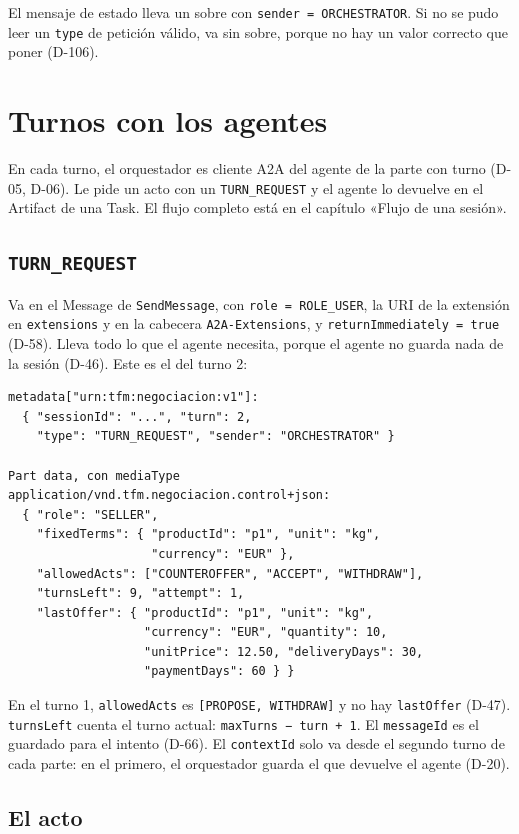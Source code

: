 El mensaje de estado lleva un sobre con \texttt{sender = ORCHESTRATOR}. Si no se pudo leer un \texttt{type} de petición válido, va sin sobre, porque no hay un valor correcto que poner (D-106).

\section{Turnos con los agentes}

En cada turno, el orquestador es cliente A2A del agente de la parte con turno (D-05, D-06). Le pide un acto con un \texttt{TURN\_REQUEST} y el agente lo devuelve en el Artifact de una Task. El flujo completo está en el capítulo «Flujo de una sesión».

\subsection{\texttt{TURN\_REQUEST}}

Va en el Message de \texttt{SendMessage}, con \texttt{role = ROLE\_USER}, la URI de la extensión en \texttt{extensions} y en la cabecera \texttt{A2A-Extensions}, y \texttt{returnImmediately = true} (D-58). Lleva todo lo que el agente necesita, porque el agente no guarda nada de la sesión (D-46). Este es el del turno 2:

\begin{verbatim}
metadata["urn:tfm:negociacion:v1"]:
  { "sessionId": "...", "turn": 2,
    "type": "TURN_REQUEST", "sender": "ORCHESTRATOR" }

Part data, con mediaType
application/vnd.tfm.negociacion.control+json:
  { "role": "SELLER",
    "fixedTerms": { "productId": "p1", "unit": "kg",
                    "currency": "EUR" },
    "allowedActs": ["COUNTEROFFER", "ACCEPT", "WITHDRAW"],
    "turnsLeft": 9, "attempt": 1,
    "lastOffer": { "productId": "p1", "unit": "kg",
                   "currency": "EUR", "quantity": 10,
                   "unitPrice": 12.50, "deliveryDays": 30,
                   "paymentDays": 60 } }
\end{verbatim}

En el turno 1, \texttt{allowedActs} es \texttt{[PROPOSE, WITHDRAW]} y no hay \texttt{lastOffer} (D-47). \texttt{turnsLeft} cuenta el turno actual: \texttt{maxTurns − turn + 1}. El \texttt{messageId} es el guardado para el intento (D-66). El \texttt{contextId} solo va desde el segundo turno de cada parte: en el primero, el orquestador guarda el que devuelve el agente (D-20).

\subsection{El acto}

